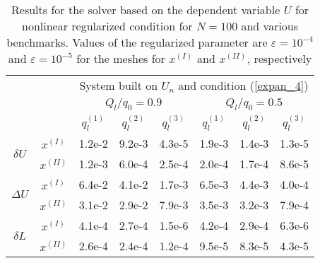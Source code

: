 \begin{table}
\centering
\begin{tabular}{c c|c@{}|c@{}|c@{}|c@{}|c@{}|c@{}|}
\cline{3-8}
& & \multicolumn{6}{c|}{System built on $U_n$ and condition (\ref{expan_4})}\\ \cline{3-8}
\cline{3-8}
& & \multicolumn{3}{c|}{$Q_l/q_0=0.9$} & \multicolumn{3}{c|}{$Q_l/q_0=0.5$} \\ \cline{3-8}
& & $q_l^{(1)}$ & $q_l^{(2)}$ & $q_l^{(3)}$ & $q_l^{(1)}$ & $q_l^{(2)}$ & $q_l^{(3)}$ \\ \cline{1-8}
\multicolumn{1}{|c}{\multirow{2}{*}{$\delta U$}} & \multicolumn{1}{|c|}{$x^{(I)}$}
 &1.2e-2&9.2e-3&4.3e-5&1.9e-3&1.4e-3&1.3e-5
 \\ \cline{2-8} \multicolumn{1}{|c}{} & \multicolumn{1}{|c|}{$x^{(II)}$}
&1.2e-3&6.0e-4&2.5e-4&2.0e-4&1.7e-4&8.6e-5
  \\ \cline{1-8} \multicolumn{1}{|c}{\multirow{2}{*}{$\Delta U$}} & \multicolumn{1}{|c|}{$x^{(I)}$}
&6.4e-2&4.1e-2&1.7e-3&6.5e-3&4.4e-3&4.0e-4
 \\ \cline{2-8} \multicolumn{1}{|c}{} & \multicolumn{1}{|c|}{$x^{(II)}$}
&3.1e-2&2.9e-2&7.9e-3&3.5e-3&3.2e-3&7.9e-4
  \\ \cline{1-8} \multicolumn{1}{|c}{\multirow{2}{*}{$\delta L$}} & \multicolumn{1}{|c|}{$x^{(I)}$}
&4.1e-4&2.7e-4&1.5e-6&4.2e-4&2.9e-4&6.3e-6
 \\ \cline{2-8} \multicolumn{1}{|c}{} & \multicolumn{1}{|c|}{$x^{(II)}$}
&2.6e-4&2.4e-4&1.2e-4&9.5e-5&8.3e-5&4.3e-5
 \\ \cline{1-8}
\end{tabular}
 \caption{Results for the solver based on the dependent variable $U$ for nonlinear regularized condition for $N=100$ and various benchmarks.
 Values of the regularized parameter are $\varepsilon=10^{-4}$ and $\varepsilon=10^{-5}$ for the meshes for $x^{(I)}$ and $x^{(II)}$, respectively}
\label{table_U_n}
\end{table}



